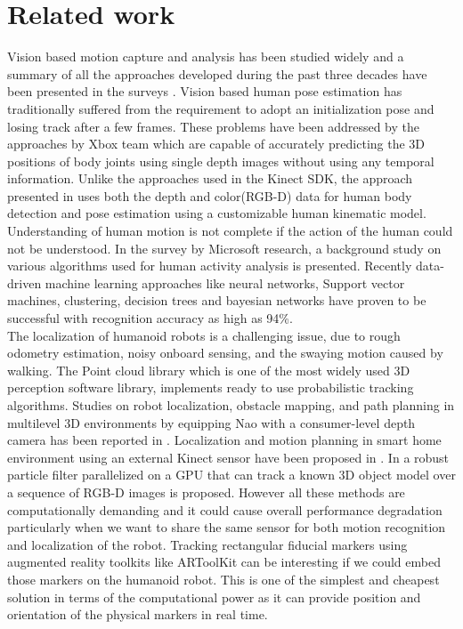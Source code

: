 \documentclass{llncs}
\begin{document}
\section{Related work}
%
%
	Vision based motion capture and analysis has been studied widely and a summary of all the approaches developed during the past three decades have been presented in the surveys \cite{Moeslund2001231}\cite{Moeslund200690}\cite{Poppe20074}. Vision based human pose estimation has traditionally suffered from the requirement to adopt an initialization pose and losing track after a few frames. These problems have been addressed by the approaches by Xbox\cite{Kinect2014} team which are capable of accurately predicting the 3D positions of body joints using single depth images without using any temporal information\cite{Shotton2011}\cite{Shotton2013}. Unlike the approaches used in the Kinect SDK, the approach presented in \cite{Buys201439} uses both the depth and color(RGB-D) data for human body detection and pose estimation using a customizable human kinematic model. Understanding of human motion is not complete if the action of the human could not be understood. In the survey by Microsoft research\cite{KinectCV2013}, a background study on various algorithms used for human activity analysis is presented. Recently data-driven machine learning approaches like neural networks, Support vector machines, clustering, decision trees and bayesian networks have proven to be successful with recognition accuracy as high as 94\%\cite{KinectSDK2014}.\\
	The localization of humanoid robots is a challenging issue, due to rough odometry estimation, noisy onboard sensing, and the swaying motion caused by walking\cite{Cervera2012}. The Point cloud library\cite{RusuPCL11} which is one of the most widely used 3D perception software library, implements ready to use probabilistic tracking algorithms\cite{RUeda2012}. Studies on robot localization, obstacle mapping, and path planning in multilevel 3D environments by equipping Nao with a consumer-level depth camera has been reported in \cite{Maier2012}. Localization and motion planning in smart home environment using an external Kinect sensor have been proposed in \cite{Cervera2012}. In \cite{choi13_rgb_d_objec_track} a robust particle filter parallelized on a GPU that can track a known 3D object model over a sequence of RGB-D images is proposed. However all these methods are computationally demanding and it could cause overall performance degradation particularly when we want to share the same sensor for both motion recognition and localization of the robot.  Tracking rectangular fiducial markers using  augmented reality toolkits like ARToolKit\cite{Kato1999} can be interesting if we could embed those markers on the humanoid robot. This is one of the simplest and cheapest solution in terms of the computational power as it can provide position and orientation of the physical markers in real time.\\
\end{document}
